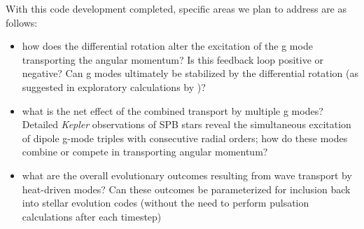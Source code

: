 With this code development completed, specific areas we plan to address are as follows:
\begin{itemize}
\item how does the differential rotation alter the excitation of the g mode transporting the angular momentum? Is this feedback loop positive or negative? Can g modes ultimately be stabilized by the differential rotation (as suggested in exploratory calculations by \cite{Townsend:2008})?
\item what is the net effect of the combined transport by multiple g modes? Detailed \emph{Kepler} observations of SPB stars \citep[e.g., KIC 10526294][]{Papics:2014} reveal the simultaneous excitation of dipole g-mode triples with consecutive radial orders; how do these modes combine or compete in transporting angular momentum?
\item what are the overall evolutionary outcomes resulting from wave transport by heat-driven modes? Can these outcomes be parameterized for inclusion back into stellar evolution codes (without the need to perform pulsation calculations after each timestep)
\end{itemize}
